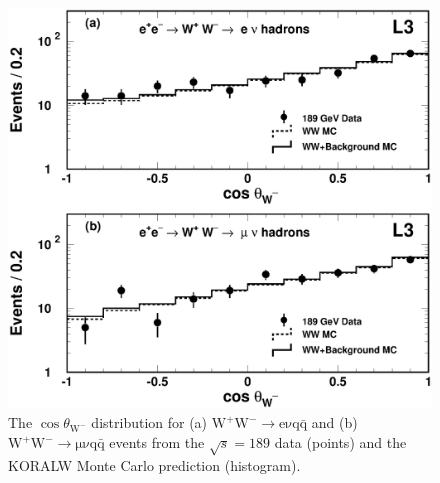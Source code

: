 \documentclass[12pt,a4paper,dvips]{article}
\newlength{\figwidth}
\begin{document}
\begin{figure}[htbp]
  \begin{center}
    \includegraphics[width=\figwidth]{wwlongfig1.eps}
  \end{center}
  \caption{The $\cos \theta_{\mathrm{W}^{-}}$ distribution for (a)
$\mathrm{W^{+}W^{-} \rightarrow e \nu q\bar{q}}$ and (b) 
$\mathrm{W^{+}W^{-} \rightarrow \mu \nu q\bar{q}}$ events 
from the $\sqrt{s}=189$ \GeV{} data (points) 
and the KORALW Monte Carlo prediction (histogram).} 
\label{fig:wwpol1}
\end{figure}
\end{document}
